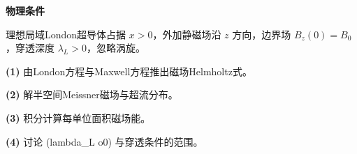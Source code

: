 \textbf{物理条件}\par 理想局域London超导体占据 \(x>0\)，外加静磁场沿 \(z\) 方向，边界场 \(B_z(0)=B_0\)，穿透深度 \(\lambda_L>0\)，忽略涡旋。
\par\noindent\textbf{(1)} 由London方程与Maxwell方程推出磁场Helmholtz式。
\par\noindent\textbf{(2)} 解半空间Meissner磁场与超流分布。
\par\noindent\textbf{(3)} 积分计算每单位面积磁场能。
\par\noindent\textbf{(4)} 讨论 (lambda\_L	o0) 与穿透条件的范围。
